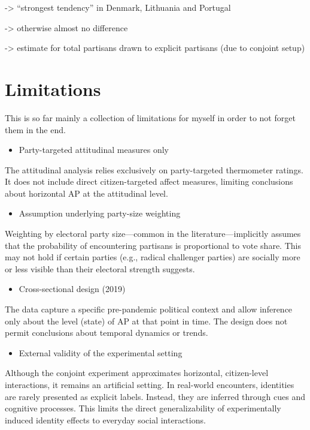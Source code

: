 \documentclass[
  12pt,
  a4paper,
  DIV=11,
  numbers=noendperiod]{scrartcl}
\providecommand{\tightlist}{%
  \setlength{\itemsep}{0pt}\setlength{\parskip}{0pt}}
\begin{document}
-\textgreater{} ``strongest tendency'' in Denmark, Lithuania and
Portugal

-\textgreater{} otherwise almost no difference

-\textgreater{} estimate for total partisans drawn to explicit partisans
(due to conjoint setup)

\section{Limitations}\label{limitations}

This is so far mainly a collection of limitations for myself in order to
not forget them in the end.

\begin{itemize}
\tightlist
\item
  Party-targeted attitudinal measures only
\end{itemize}

The attitudinal analysis relies exclusively on party-targeted
thermometer ratings. It does not include direct citizen-targeted affect
measures, limiting conclusions about horizontal AP at the attitudinal
level.

\begin{itemize}
\tightlist
\item
  Assumption underlying party-size weighting
\end{itemize}

Weighting by electoral party size---common in the
literature---implicitly assumes that the probability of encountering
partisans is proportional to vote share. This may not hold if certain
parties (e.g., radical challenger parties) are socially more or less
visible than their electoral strength suggests.

\begin{itemize}
\tightlist
\item
  Cross-sectional design (2019)
\end{itemize}

The data capture a specific pre-pandemic political context and allow
inference only about the level (state) of AP at that point in time. The
design does not permit conclusions about temporal dynamics or trends.

\begin{itemize}
\tightlist
\item
  External validity of the experimental setting
\end{itemize}

Although the conjoint experiment approximates horizontal, citizen-level
interactions, it remains an artificial setting. In real-world
encounters, identities are rarely presented as explicit labels. Instead,
they are inferred through cues and cognitive processes. This limits the
direct generalizability of experimentally induced identity effects to
everyday social interactions.
\end{document}
